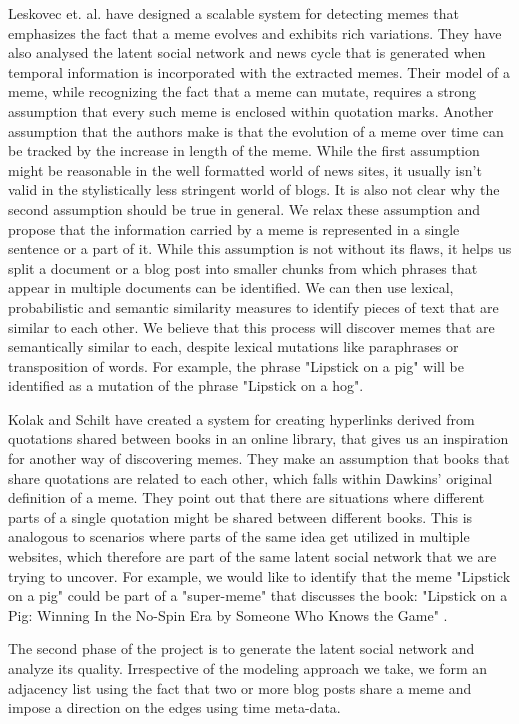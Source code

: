 \documentclass{acm_proc_article-sp}
\begin{document}
Leskovec et. al. \cite{leskovec2009meme} have designed a scalable system for detecting memes that emphasizes the fact that a meme evolves and exhibits rich variations. They have also analysed the latent social network and news cycle that is generated when temporal information is incorporated with the extracted memes. Their model of a meme, while recognizing the fact that a meme can mutate, requires a strong assumption that every such meme is enclosed within quotation marks. Another assumption that the authors make is that the evolution of a meme over time can be tracked by the increase in length of the meme. While the first assumption might be reasonable in the well formatted world of news sites, it usually isn't valid in the stylistically less stringent world of blogs. It is also not clear why the second assumption should be true in general. We relax these assumption and propose that the information carried by a meme is represented in a single sentence or a part of it. While this assumption is not without its flaws, it helps us split a document or a blog post into smaller chunks from which phrases that appear in multiple documents can be identified. We can then use lexical, probabilistic and semantic similarity measures to identify pieces of text that are similar to each other. We believe that this process will discover memes that are semantically similar to each, despite lexical mutations like paraphrases or transposition of words. For example, the phrase "Lipstick on a pig" will be identified as a mutation of the phrase "Lipstick on a hog". 

Kolak and Schilt \cite{kolak2008generating} have created a system for creating hyperlinks derived from quotations shared between books in an online library, that gives us an inspiration for another way of discovering memes. They make an assumption that books that share quotations are related to each other, which falls within Dawkins' original definition of a meme. They point out that there are situations where different parts of a single quotation might be shared between different books. This is analogous to scenarios where parts of the same idea get utilized in multiple websites, which therefore are part of the same latent social network that we are trying to uncover. For example, we would like to identify that the meme "Lipstick on a pig" could be part of a "super-meme" that discusses the book: "Lipstick on a Pig: Winning In the No-Spin Era by Someone Who Knows the Game" \cite{clarke2006lipstick}.  

The second phase of the project is to generate the latent social network and analyze its quality. Irrespective of the modeling approach we take, we form an adjacency list using the fact that two or more blog posts share a meme and impose a direction on the edges using time meta-data. 
\end{document}
